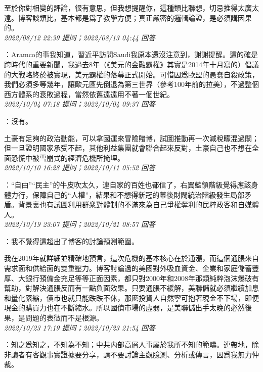 \documentclass[twocolumn]{ctexart}
\begin{document}
至於你對相變的評論，很有意思，但我想提醒你，這種類比聯想，切忌推得太廣太遠。博客談類比，基本都是爲了教學方便；真正嚴密的邏輯論證，是必須講因果的。
\\

\textit{\hfill\noindent\small 2022/08/12 22:39 提问；2022/08/13 04:44 回答}

：Aramco的事我知道，習近平訪問Saudi我原本還沒注意到，謝謝提醒。這的確是跨時代的重要新聞，我過去8年（《美元的金融霸權》其實是2014年十月寫的）倡議的大戰略終於被實現，美元霸權的落幕正式開始。可惜因爲歐盟的愚蠢自殺政策，我們必須多等幾年，讓歐元區先倒退為第三世界（參考100年前的拉美），不過整個西方體系的衰敗過程，當然依舊遠遠用不著一個世紀。
\\

\textit{\hfill\noindent\small 2022/10/04 07:18 提问；2022/10/04 09:37 回答}

：沒有。

土豪有足夠的政治動能，可以拿國運來冒險賭博，試圖推動再一次減稅矇混過關；但一旦證明國家承受不起，其他利益集團就會聯合起來反對，土豪自己也不想在全面恐慌中被雪崩式的經濟危機所掩埋。
\\

\textit{\hfill\noindent\small 2022/10/10 16:28 提问；2022/10/11 05:52 回答}

：“自由”“民主”的牛皮吹太久，連自家的百姓也都信了，右翼藍領階級覺得應該身體力行，保障自己的“人權”，結果和不想得新冠的幕後財閥統治階級發生局部矛盾。背景裏也有試圖利用群衆對體制的不滿來為自己爭權奪利的民粹政客和自媒體人。
\\

\textit{\hfill\noindent\small 2022/10/19 23:07 提问；2022/10/21 08:57 回答}

：我不覺得這超出了博客的討論預測範圍。

我在2019年就詳細並精確地預言，這次危機的基本核心在於通漲，而這個通脹來自需求面和供給面的雙重壓力。博客討論過的美國對外吸血資金、企業和家庭儲蓄豐厚、大銀行預備金充足等等正面因素，都只對2000年和2008年那類純粹泡沫爆破有幫助，對解決通脹反而有一點負面效果。只要通脹不緩解，美聯儲就必須繼續加息和量化緊縮，債市也就只能跌跌不休，那麽投資人自然寧可抱著現金不下場，即便現金的購買力也在不斷縮水。所以國債市場的虛弱，是美聯儲出手太晚的必然後果，是問題的表徵而不是根源。
\\

\textit{\hfill\noindent\small 2022/10/23 17:19 提问；2022/10/23 21:54 回答}

：知之爲知之，不知為不知；中共内部高層人事屬於我所不知的範疇。連帶地，除非讀者有客觀事實證據要分享，請不要討論主觀臆測、分析或傳言，因爲我無力仲裁。
\end{document}
